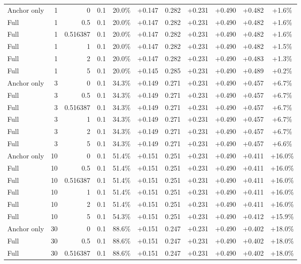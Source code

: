 \begin{table}[htbp]
\begin{tabular}{lrrrccccccc}
Anchor only & 1 & 0 & 0.1 & 20.0\% & +0.147 & 0.282 & +0.231 & +0.490 & +0.482 & +1.6\% \\
Full & 1 & 0.5 & 0.1 & 20.0\% & +0.147 & 0.282 & +0.231 & +0.490 & +0.482 & +1.6\% \\
Full & 1 & 0.516387 & 0.1 & 20.0\% & +0.147 & 0.282 & +0.231 & +0.490 & +0.482 & +1.6\% \\
Full & 1 & 1 & 0.1 & 20.0\% & +0.147 & 0.282 & +0.231 & +0.490 & +0.482 & +1.5\% \\
Full & 1 & 2 & 0.1 & 20.0\% & +0.147 & 0.282 & +0.231 & +0.490 & +0.483 & +1.3\% \\
Full & 1 & 5 & 0.1 & 20.0\% & +0.145 & 0.285 & +0.231 & +0.490 & +0.489 & +0.2\% \\
Anchor only & 3 & 0 & 0.1 & 34.3\% & +0.149 & 0.271 & +0.231 & +0.490 & +0.457 & +6.7\% \\
Full & 3 & 0.5 & 0.1 & 34.3\% & +0.149 & 0.271 & +0.231 & +0.490 & +0.457 & +6.7\% \\
Full & 3 & 0.516387 & 0.1 & 34.3\% & +0.149 & 0.271 & +0.231 & +0.490 & +0.457 & +6.7\% \\
Full & 3 & 1 & 0.1 & 34.3\% & +0.149 & 0.271 & +0.231 & +0.490 & +0.457 & +6.7\% \\
Full & 3 & 2 & 0.1 & 34.3\% & +0.149 & 0.271 & +0.231 & +0.490 & +0.457 & +6.7\% \\
Full & 3 & 5 & 0.1 & 34.3\% & +0.149 & 0.271 & +0.231 & +0.490 & +0.457 & +6.6\% \\
Anchor only & 10 & 0 & 0.1 & 51.4\% & +0.151 & 0.251 & +0.231 & +0.490 & +0.411 & +16.0\% \\
Full & 10 & 0.5 & 0.1 & 51.4\% & +0.151 & 0.251 & +0.231 & +0.490 & +0.411 & +16.0\% \\
Full & 10 & 0.516387 & 0.1 & 51.4\% & +0.151 & 0.251 & +0.231 & +0.490 & +0.411 & +16.0\% \\
Full & 10 & 1 & 0.1 & 51.4\% & +0.151 & 0.251 & +0.231 & +0.490 & +0.411 & +16.0\% \\
Full & 10 & 2 & 0.1 & 51.4\% & +0.151 & 0.251 & +0.231 & +0.490 & +0.411 & +16.0\% \\
Full & 10 & 5 & 0.1 & 54.3\% & +0.151 & 0.251 & +0.231 & +0.490 & +0.412 & +15.9\% \\
Anchor only & 30 & 0 & 0.1 & 88.6\% & +0.151 & 0.247 & +0.231 & +0.490 & +0.402 & +18.0\% \\
Full & 30 & 0.5 & 0.1 & 88.6\% & +0.151 & 0.247 & +0.231 & +0.490 & +0.402 & +18.0\% \\
Full & 30 & 0.516387 & 0.1 & 88.6\% & +0.151 & 0.247 & +0.231 & +0.490 & +0.402 & +18.0\% \\

\end{tabular}
\end{table}

